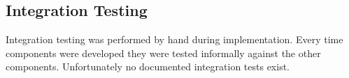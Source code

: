 \subsection{Integration Testing}
Integration testing was performed by hand during implementation. Every time components were developed they were tested informally against the other components. Unfortunately no documented integration tests exist.